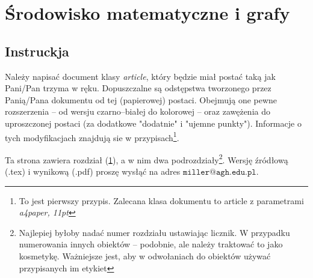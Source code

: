 \documentclass[a4paper, 11pt]{article}
\begin{document}
\pagestyle{fancy}
\section{Środowisko matematyczne i grafy}
\label{title}

\subsection{Instruckja}
Należy napisać document klasy {\em article}, który będzie miał postać taką jak Pani/Pan trzyma w ręku. Dopuszczalne są odstępstwa tworzonego przez Panią/Pana dokumentu od tej (papierowej) postaci. Obejmują one pewne rozszerzenia -- od wersju czarno--białej do kolorowej -- oraz zawężenia do uproszczonej postaci (za dodatkowe "dodatnie" i "ujemne punkty"). Informacje o tych modyfikacjach znajdują sie w przypisach\footnote{To jest pierwszy przypis. Zalecana klasa dokumentu to article z parametrami {\em a4paper, 11pt}}.

Ta strona zawiera rozdział (\ref{title}), a w nim dwa podrozdziały\footnote{Najlepiej byłoby nadać numer rozdziału ustawiając licznik. W przypadku numerowania innych obiektów -- podobnie, ale należy traktować to jako kosmetykę. Ważniejsze jest, aby w odwołaniach do obiektów używać przypisanych im etykiet}. Wersję źródłową (.tex) i wynikową (.pdf) proszę wysłąć na adres $\mathtt{miller@agh.edu.pl}$.
\end{document}
